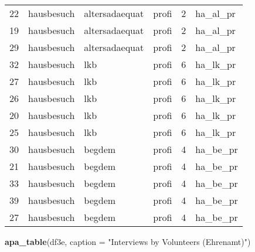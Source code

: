 \documentclass[
  doc,floatsintext]{apa6}
\newenvironment{Shaded}{\begin{snugshade}}{\end{snugshade}}
\newcommand{\AttributeTok}[1]{\textcolor[rgb]{0.13,0.29,0.53}{#1}}
\newcommand{\FunctionTok}[1]{\textcolor[rgb]{0.13,0.29,0.53}{\textbf{#1}}}
\newcommand{\NormalTok}[1]{#1}
\newcommand{\StringTok}[1]{\textcolor[rgb]{0.31,0.60,0.02}{#1}}
\begin{document}
\begin{table}[tbp]
\begin{center}
\begin{threeparttable}
\begin{tabular}{llllll}
22 & hausbesuch & altersadaequat & profi & 2 & ha\_al\_pr\\
19 & hausbesuch & altersadaequat & profi & 2 & ha\_al\_pr\\
29 & hausbesuch & altersadaequat & profi & 2 & ha\_al\_pr\\
32 & hausbesuch & lkb & profi & 6 & ha\_lk\_pr\\
27 & hausbesuch & lkb & profi & 6 & ha\_lk\_pr\\
26 & hausbesuch & lkb & profi & 6 & ha\_lk\_pr\\
20 & hausbesuch & lkb & profi & 6 & ha\_lk\_pr\\
25 & hausbesuch & lkb & profi & 6 & ha\_lk\_pr\\
30 & hausbesuch & begdem & profi & 4 & ha\_be\_pr\\
21 & hausbesuch & begdem & profi & 4 & ha\_be\_pr\\
33 & hausbesuch & begdem & profi & 4 & ha\_be\_pr\\
39 & hausbesuch & begdem & profi & 4 & ha\_be\_pr\\
27 & hausbesuch & begdem & profi & 4 & ha\_be\_pr\\
\bottomrule
\end{tabular}

\end{threeparttable}
\end{center}

\end{table}

\begin{Shaded}
\begin{Highlighting}[]
\FunctionTok{apa\_table}\NormalTok{(df3e,  }\AttributeTok{caption =} \StringTok{"Interviews by Volunteers (Ehrenamt)"}\NormalTok{)}
\end{Highlighting}
\end{Shaded}
\end{document}
